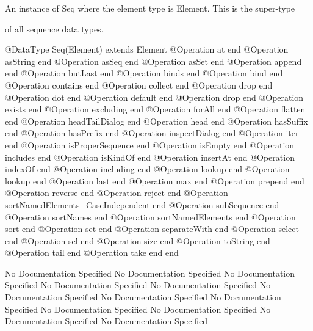       An instance of Seq where the element type is Element. This is the super-type

      of all sequence data types.
\begin{Interface}
@DataType Seq(Element) extends Element
  @Operation at end
  @Operation asString end
  @Operation asSeq end
  @Operation asSet end
  @Operation append end
  @Operation butLast end
  @Operation binds end
  @Operation bind end
  @Operation contains end
  @Operation collect end
  @Operation drop end
  @Operation dot end
  @Operation default end
  @Operation drop end
  @Operation exists end
  @Operation excluding end
  @Operation forAll end
  @Operation flatten end
  @Operation headTailDialog end
  @Operation head end
  @Operation hasSuffix end
  @Operation hasPrefix end
  @Operation inspectDialog end
  @Operation iter end
  @Operation isProperSequence end
  @Operation isEmpty end
  @Operation includes end
  @Operation isKindOf end
  @Operation insertAt end
  @Operation indexOf end
  @Operation including end
  @Operation lookup end
  @Operation lookup end
  @Operation last end
  @Operation max end
  @Operation prepend end
  @Operation reverse end
  @Operation reject end
  @Operation sortNamedElements_CaseIndependent end
  @Operation subSequence end
  @Operation sortNames end
  @Operation sortNamedElements end
  @Operation sort end
  @Operation set end
  @Operation separateWith end
  @Operation select end
  @Operation sel end
  @Operation size end
  @Operation toString end
  @Operation tail end
  @Operation take end
end
\end{Interface}
No Documentation Specified
No Documentation Specified
No Documentation Specified
No Documentation Specified
No Documentation Specified
No Documentation Specified
No Documentation Specified
No Documentation Specified
No Documentation Specified
No Documentation Specified
No Documentation Specified
No Documentation Specified
